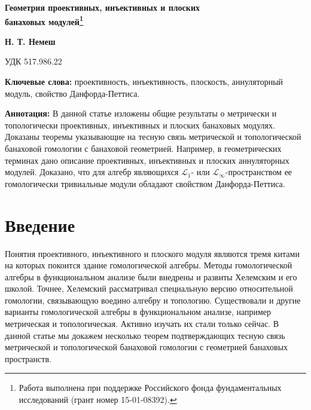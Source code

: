 \documentclass[12pt]{article}
\begin{document}
\begin{flushleft}
\Large \textbf{Геометрия проективных, инъективных и плоских\\ банаховых модулей\footnote{Работа выполнена при поддержке Российского фонда фундаментальных исследований (грант номер 15-01-08392).}}\\[0.5cm]
\end{flushleft}
\begin{flushright}
\normalsize \textbf{Н. Т. Немеш}\\[0.5cm]
\end{flushright}
\begin{flushleft}
\small {УДК 517.986.22}\\[0.5cm]
\end{flushleft}

\thispagestyle{empty}

\textbf{Ключевые слова:} проективность, инъективность, плоскость, аннуляторный модуль, свойство Данфорда-Петтиса.
\medskip

\textbf{Аннотация:} В данной статье изложены общие результаты о метрически и топологически проективных, инъективных и плоских банаховых модулях. Доказаны теоремы указывающие на тесную связь метрической и топологической банаховой гомологии с банаховой геометрией. Например, в геометрических терминах дано описание проективных, инъективных и плоских аннуляторных модулей. Доказано, что для алгебр являющихся  $\mathscr{L}_1$- или $\mathscr{L}_\infty$-пространством ее гомологически тривиальные модули обладают свойством Данфорда-Петтиса.
\medskip


\section{Введение}
\label{SectionIntroduction}

Понятия проективного, инъективного и плоского модуля являются тремя китами на которых покоится здание гомологической алгебры. Методы гомологической алгебры в функциональном анализе были внедрены и развиты Хелемским и его школой. Точнее, Хелемский рассматривал специальную версию относительной гомологии, связывающую воедино алгебру и топологию. Существовали и другие варианты гомологической алгебры в функциональном анализе, например метрическая и топологическая. Активно изучать их стали только сейчас. В данной статье мы докажем несколько теорем подтверждающих тесную связь метрической и топологической банаховой гомологии с геометрией банаховых пространств.
\end{document}
